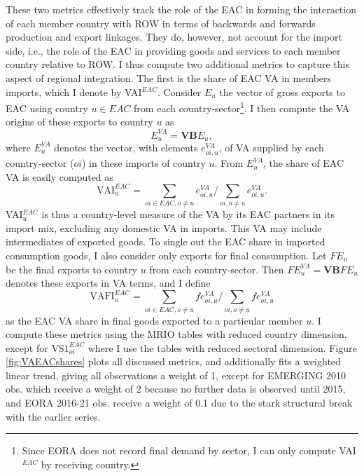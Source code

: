 \documentclass[a4paper]{article}
\begin{document}
%
These two metrics effectively track the role of the EAC in forming the interaction of each member country with ROW in terms of backwards and forwards production and export linkages. They do, however, not account for the import side, i.e., the role of the EAC in providing goods and services to each member country relative to ROW. I thus compute two additional metrics to capture this aspect of regional integration. The first is the share of EAC VA in members imports, which I denote by VAI$^{EAC}$. Consider $E_u$ the vector of gross exports to EAC using country $u \in EAC$ from each country-sector\footnote{Since EORA does not record final demand by sector, I can only compute VAI$^{EAC}$ by receiving country. \vspace{-8mm}}. I then compute the VA origins of these exports to country $u$ as 
%
\begin{equation}
E_u^{VA} = \textbf{VB}E_u,
\end{equation}
%
\noindent where $E_u^{VA}$ denotes the vector, with elements $e_{oi, u}^{VA}$, of VA supplied by each country-sector ($oi$) in these imports of country $u$. From  $E_u^{VA}$, the share of EAC VA is easily computed as 
%
\begin{equation}
\text{VAI}_u^{EAC} = \sum_{oi \in EAC, o \neq u}  e_{oi, u}^{VA}  \bigg/ \sum_{oi, o \neq u}  e_{oi, u}^{VA}.  
\end{equation}
%
VAI$_u^{EAC}$ is thus a country-level measure of the VA by its EAC partners in its import mix, excluding any domestic VA in imports. This VA may include intermediates of exported goods. To single out the EAC share in imported consumption goods, I also consider only exports for final consumption. Let $FE_u$ be the final exports to country $u$ from each country-sector. Then $FE_u^{VA} = \textbf{VB}FE_u$ denotes these exports in VA terms, and I define
%
\begin{equation} \label{eq:VAFI_EAC}
\text{VAFI}_{u}^{EAC} = \sum_{oi \in EAC, o \neq u}  fe_{oi, u}^{VA}  \bigg/ \sum_{oi, o \neq u}  fe_{oi, u}^{VA}
\end{equation}
%
\noindent as the EAC VA share in final goods exported to a particular member $u$. I compute these metrics using the MRIO tables with reduced country dimension, except for $\text{VS1}_{oi}^{EAC}$ where I use the tables with reduced sectoral dimension. Figure \ref{fig:VAEACshares} plots all discussed metrics, and additionally fits a weighted linear trend, giving all observations a weight of 1, except for EMERGING 2010 obs. which receive a weight of 2 because no further data is observed until 2015, and EORA 2016-21 obs. receive a weight of 0.1 due to the stark structural break with the earlier series. 
\end{document}
